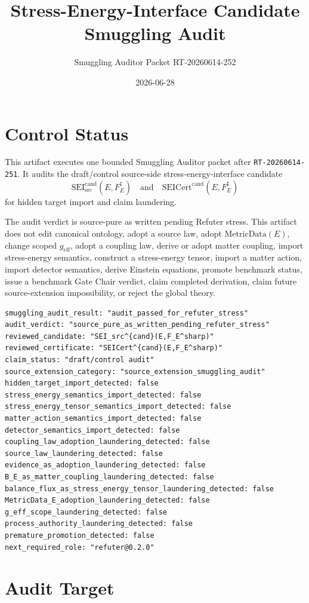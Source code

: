 \documentclass[11pt]{article}
\title{Stress-Energy-Interface Candidate Smuggling Audit}
\author{Smuggling Auditor Packet RT-20260614-252}
\date{2026-06-28}
\newcommand{\MetricData}{\mathrm{MetricData}}
\newcommand{\geff}{g_{\mathrm{eff}}}
\newcommand{\SEICand}{\mathrm{SEI}_{\mathrm{src}}^{\mathrm{cand}}}
\newcommand{\SEICertCand}{\mathrm{SEICert}^{\mathrm{cand}}}
\begin{document}
\maketitle

\section{Control Status}

This artifact executes one bounded Smuggling Auditor packet after
\texttt{RT-20260614-251}. It audits the draft/control source-side
stress-energy-interface candidate
\[
  \SEICand(E,F_E^\sharp)
  \quad\text{and}\quad
  \SEICertCand(E,F_E^\sharp)
\]
for hidden target import and claim laundering.

The audit verdict is source-pure as written pending Refuter stress. This
artifact does not edit canonical ontology, adopt a source law, adopt
\(\MetricData(E)\), change scoped \(\geff\), adopt a coupling law, derive or
adopt matter coupling, import stress-energy semantics, construct a
stress-energy tensor, import a matter action, import detector semantics,
derive Einstein equations, promote benchmark status, issue a benchmark Gate
Chair verdict, claim completed derivation, claim future source-extension
impossibility, or reject the global theory.

\begin{verbatim}
smuggling_audit_result: "audit_passed_for_refuter_stress"
audit_verdict: "source_pure_as_written_pending_refuter_stress"
reviewed_candidate: "SEI_src^{cand}(E,F_E^sharp)"
reviewed_certificate: "SEICert^{cand}(E,F_E^sharp)"
claim_status: "draft/control audit"
source_extension_category: "source_extension_smuggling_audit"
hidden_target_import_detected: false
stress_energy_semantics_import_detected: false
stress_energy_tensor_semantics_import_detected: false
matter_action_semantics_import_detected: false
detector_semantics_import_detected: false
coupling_law_adoption_laundering_detected: false
source_law_laundering_detected: false
evidence_as_adoption_laundering_detected: false
B_E_as_matter_coupling_laundering_detected: false
balance_flux_as_stress_energy_tensor_laundering_detected: false
MetricData_E_adoption_laundering_detected: false
g_eff_scope_laundering_detected: false
process_authority_laundering_detected: false
premature_promotion_detected: false
next_required_role: "refuter@0.2.0"
\end{verbatim}

\section{Audit Target}
\end{document}
